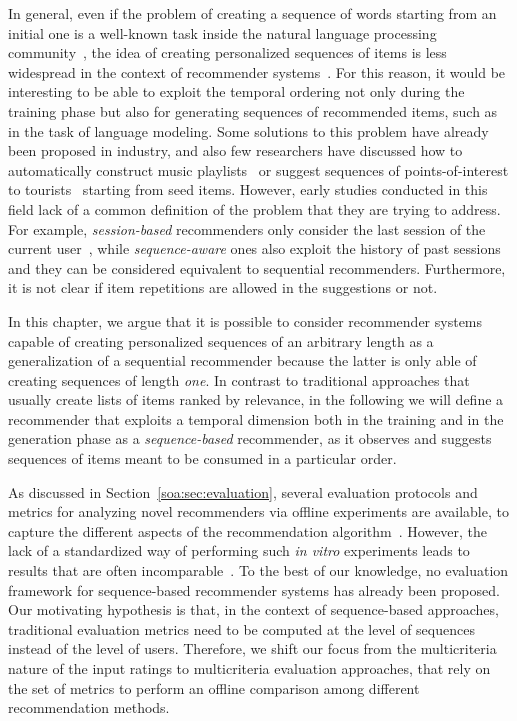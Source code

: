 In general, even if the problem of creating a sequence of words starting from an initial one is a well-known task inside the natural language processing community~\cite{Jurafsky2008}, the idea of creating personalized sequences of items is less widespread in the context of recommender systems~\cite{Herlocker2004}. For this reason, it would be interesting to be able to exploit the temporal ordering not only during the training phase but also for generating sequences of recommended items, such as in the task of language modeling. Some solutions to this problem have already been proposed in industry, and also few researchers have discussed how to automatically construct music playlists~\cite{Chen2012} or suggest sequences of points-of-interest to tourists~\cite{Feng2015} starting from seed items. However, early studies conducted in this field lack of a common definition of the problem that they are trying to address. For example, \emph{session-based} recommenders only consider the last session of the current user~\cite{Ludewig2018}, while \emph{sequence-aware} ones also exploit the history of past sessions~\cite{Quadrana2018} and they can be considered equivalent to sequential recommenders. Furthermore, it is not clear if item repetitions are allowed in the suggestions or not.

In this chapter, we argue that it is possible to consider recommender systems capable of creating personalized sequences of an arbitrary length as a generalization of a sequential recommender because the latter is only able of creating sequences of length \emph{one}. In contrast to traditional approaches that usually create lists of items ranked by relevance, in the following we will define a recommender that exploits a temporal dimension both in the training and in the generation phase as a \emph{sequence-based} recommender, as it observes and suggests sequences of items meant to be consumed in a particular order.

As discussed in Section~\ref{soa:sec:evaluation}, several evaluation protocols and metrics for analyzing novel recommenders via offline experiments are available, to capture the different aspects of the recommendation algorithm~\cite{Gunawardana2015}. However, the lack of a standardized way of performing such \textit{in vitro} experiments leads to results that are often incomparable~\cite{Jannach2015}. To the best of our knowledge, no evaluation framework for sequence-based recommender systems has already been proposed. Our motivating hypothesis is that, in the context of sequence-based approaches, traditional evaluation metrics need to be computed at the level of sequences instead of the level of users. Therefore, we shift our focus from the multicriteria nature of the input ratings to multicriteria evaluation approaches, that rely on the set of metrics to perform an offline comparison among different recommendation methods.

